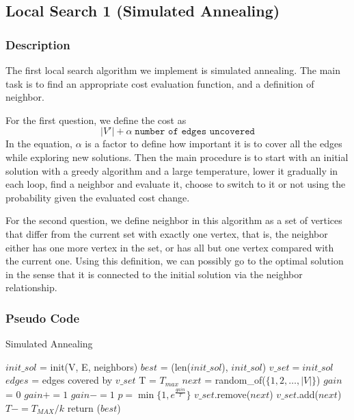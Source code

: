\documentclass[acmlarge]{acmart}
\begin{document}
\subsection{Local Search 1 (Simulated Annealing)}

\subsubsection{Description}

The first local search algorithm we implement is simulated annealing. The main task is to find an appropriate cost evaluation function, and a definition of neighbor. 

For the first question, we define the cost as $$|V'|+\alpha\; \texttt{number of edges uncovered}$$ 
In the equation, $\alpha$ is a factor to define how important it is to cover all the edges while exploring new solutions. Then the main procedure is to start with an initial solution with a greedy algorithm and a large temperature, lower it gradually in each loop, find a neighbor and evaluate it, choose to switch to it or not using the probability given the evaluated cost change.

For the second question, we define neighbor in this algorithm as a set of vertices that differ from the current set with exactly one vertex, that is, the neighbor either has one more vertex in the set, or has all but one vertex compared with the current one. Using this definition, we can possibly go to the optimal solution in the sense that it is connected to the initial solution via the neighbor relationship.


\subsubsection{Pseudo Code}

\begin{algorithm}[H]
	\caption{Simulated Annealing}
	\SetAlgoLined
	$init\_sol$ = init(V, E, neighbors)\;
	$best$ = (len($init\_sol$), $init\_sol$)\;
	$v\_set = init\_sol$\;
	$edges$ = edges covered by $v\_set$\;
	T = $T_{max}$\;
	{
		$next$ = random\_of($\{1,2,\dots,|V|\}$)\;
		$gain$ = 0\;
		{
			$gain += 1$\;
			{
			}
		}
		\Else
		{
			$gain -= 1$\;
			{
			}
		}
		$p = \min\{1, e^{\frac{gain}{T}}\}$\;
		{
			{
				$v\_set$.remove($next$)\;
				{
					\;
				}
			}
			\Else
			{
				$v\_set$.add($next$)\;
				{
				}
			}
		}
		$T -= T_{MAX}/k$\;
	}
	return ($best$)
\end{algorithm}
\end{document}
